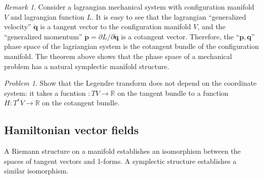 \documentclass{book}
\numberwithin{equation}{section}
\theoremstyle{plain}
\theoremstyle{definition}
\theoremstyle{remark}
\newtheorem*{rem*}{Remark}
\theoremstyle{remark}
\newtheorem*{prob*}{Problem}
\begin{document}
\begin{rem*}
Consider a lagrangian mechanical system with configuration manifold $V$
and lagrangian function $L$.
It is easy to see that the lagrangian ``generalized velocity''
$\dot{\mathbf q}$ is a tangent vector to the configuration manifold $V$,
and the ``generalized momentum''
$\dot{\mathbf p} = \partial L/\partial \dot{\mathbf q}$
is a cotangent vector.
Therefore, the ``$\mathbf p, \mathbf q$'' phase space of the lagriangian
system is the cotangent bundle of the configuration manifold.
The theorem above shows that the phase space of a mechanical problem
has a natural symplectic manifold structure.
\end{rem*}

\begin{prob*}
  Show that the Legendre transform does not depend on the coordinate system:
  it takes a fucntion $:TV \rightarrow \mathbb R$ on the tangent bundle
  to a function $H: T^*V \rightarrow \mathbb R$ on the cotangent bundle.


\end{prob*}

\subsection{Hamiltonian vector fields}



A Riemann structure on a manifold establishes an isomorphism between
the spaces of tangent vectors and 1-forms.
%
A symplectic structure establishes a similar isomorphism.
\end{document}
